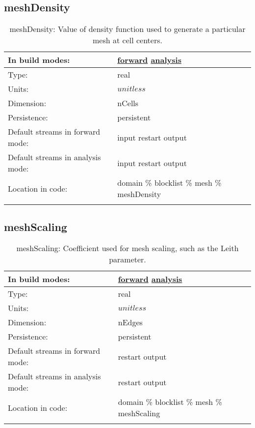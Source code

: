 \subsection[meshDensity]{meshDensity}
\label{subsec:var_sec_mesh_meshDensity}
\begin{center}
\begin{longtable}{| p{2.0in} | p{4.0in} |}
        \hline 
        In build modes: & \hyperref[subsec:forward_var_tab_mesh]{forward} \hyperref[subsec:analysis_var_tab_mesh]{analysis} \\
        \hline 
        Type: & real \\
        \hline 
        Units: & $unitless$ \\
        \hline 
        Dimension: & nCells \\
        \hline 
        Persistence: & persistent \\
        \hline 
		 Default streams in forward mode: &  input restart output \\
        \hline 
		 Default streams in analysis mode: &  input restart output \\
        \hline 
		 Location in code: & domain \% blocklist \% mesh \% meshDensity \\
		 \hline 
    \caption{meshDensity: Value of density function used to generate a particular mesh at cell centers.}
\end{longtable}
\end{center}
\subsection[meshScaling]{meshScaling}
\label{subsec:var_sec_mesh_meshScaling}
\begin{center}
\begin{longtable}{| p{2.0in} | p{4.0in} |}
        \hline 
        In build modes: & \hyperref[subsec:forward_var_tab_mesh]{forward} \hyperref[subsec:analysis_var_tab_mesh]{analysis} \\
        \hline 
        Type: & real \\
        \hline 
        Units: & $unitless$ \\
        \hline 
        Dimension: & nEdges \\
        \hline 
        Persistence: & persistent \\
        \hline 
		 Default streams in forward mode: &  restart output \\
        \hline 
		 Default streams in analysis mode: &  restart output \\
        \hline 
		 Location in code: & domain \% blocklist \% mesh \% meshScaling \\
		 \hline 
    \caption{meshScaling: Coefficient used for mesh scaling, such as the Leith parameter.}
\end{longtable}
\end{center}
